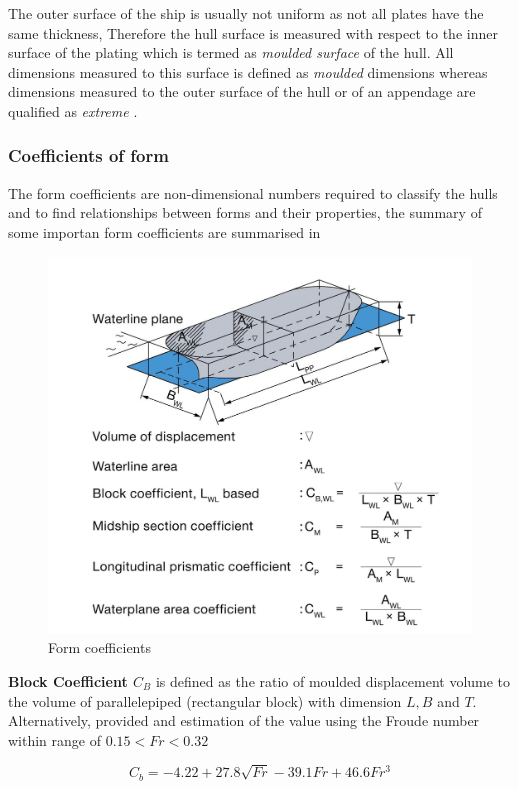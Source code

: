 The outer surface of the ship is usually not uniform as not all plates have the same thickness, Therefore the hull surface is measured with respect to the inner surface of the plating which is termed as \emph{moulded surface} of the hull. All dimensions measured to this surface is defined as \emph{moulded} dimensions whereas dimensions measured to the outer surface of the hull or of an appendage are qualified as \emph{extreme} .

\subsubsection*{Coefficients of form}

The form coefficients are non-dimensional numbers required to classify the hulls and to find relationships between forms and their properties, the summary of some importan form coefficients are summarised in  

\begin{figure}[ht]
    \centering
        \includegraphics[width=.6\textwidth]{02_figures/man11_shipcoeff.jpg}
        \caption{Form coefficients }
        \label{fig:man_formcoeff}
\end{figure}

\textbf{Block Coefficient $C_B$} is defined as the ratio of moulded displacement volume to the volume of parallelepiped (rectangular block) with dimension $L,B$ and $T$. Alternatively,  provided and estimation of the value using the Froude number within range of $0.15 < Fr < 0.32$

\begin{equation}
    \label{eqn:Cb_Schneekluth}
    C_b = -4.22 + 27.8\sqrt{Fr} - 39.1Fr + 46.6Fr^3
\end{equation}

